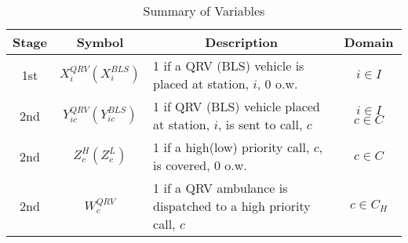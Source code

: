 \documentclass[12pt]{report}
\begin{document}
%
\begin{table}[H]
\centering
\caption{Summary of Variables\label{tbl:Variables}}
{\begin{tabular}{c c p{4in} c} \hline
Stage & Symbol & \multicolumn{1}{c}{Description} & Domain \\
\hline
 1{st} & $X^{QRV}_{i} (X^{BLS}_{i})$ &   1 if a QRV  (BLS) vehicle is placed at station, $i$, 0 o.w. & $i \in I$ \\
 2{nd} & $Y^{QRV}_{ic} (Y^{BLS}_{ic})$ & 1 if QRV (BLS) vehicle placed at station, $i$, is sent to call, $c$ & $ i \in I$ $c \in C$\\
 2{nd} & $Z^{H}_{c}(Z^{L}_{c})$ & 1 if a high(low) priority call, $c$, is covered, 0 o.w. & $c \in C$\\
 2{nd} & $W^{QRV}_{c}$ & 1 if a QRV ambulance is dispatched to a high priority call, $c$ & $c \in C_H$ \\
\hline
\end{tabular}}
\end{table}
\end{document}
